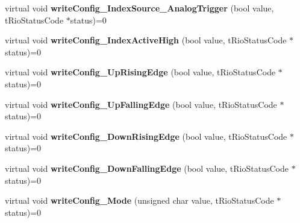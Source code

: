 \begin{DoxyCompactItemize}
\item 
\hypertarget{classnFPGA_1_1nFRC__2012__1__6__4_1_1tCounter_ad03db9ff9f48d67f1595a1c8d3b588aa}{
virtual void {\bfseries writeConfig\_\-IndexSource\_\-AnalogTrigger} (bool value, tRioStatusCode $\ast$status)=0}
\label{classnFPGA_1_1nFRC__2012__1__6__4_1_1tCounter_ad03db9ff9f48d67f1595a1c8d3b588aa}

\item 
\hypertarget{classnFPGA_1_1nFRC__2012__1__6__4_1_1tCounter_ae39e2f5f96f1052ef96d53181992181a}{
virtual void {\bfseries writeConfig\_\-IndexActiveHigh} (bool value, tRioStatusCode $\ast$status)=0}
\label{classnFPGA_1_1nFRC__2012__1__6__4_1_1tCounter_ae39e2f5f96f1052ef96d53181992181a}

\item 
\hypertarget{classnFPGA_1_1nFRC__2012__1__6__4_1_1tCounter_aeb59a5a98113fbf942f50ac3be8585b2}{
virtual void {\bfseries writeConfig\_\-UpRisingEdge} (bool value, tRioStatusCode $\ast$status)=0}
\label{classnFPGA_1_1nFRC__2012__1__6__4_1_1tCounter_aeb59a5a98113fbf942f50ac3be8585b2}

\item 
\hypertarget{classnFPGA_1_1nFRC__2012__1__6__4_1_1tCounter_acbb2b6f8e53f82a1be96b80454abe710}{
virtual void {\bfseries writeConfig\_\-UpFallingEdge} (bool value, tRioStatusCode $\ast$status)=0}
\label{classnFPGA_1_1nFRC__2012__1__6__4_1_1tCounter_acbb2b6f8e53f82a1be96b80454abe710}

\item 
\hypertarget{classnFPGA_1_1nFRC__2012__1__6__4_1_1tCounter_aa7fee146234fb6336c890e75c3d72048}{
virtual void {\bfseries writeConfig\_\-DownRisingEdge} (bool value, tRioStatusCode $\ast$status)=0}
\label{classnFPGA_1_1nFRC__2012__1__6__4_1_1tCounter_aa7fee146234fb6336c890e75c3d72048}

\item 
\hypertarget{classnFPGA_1_1nFRC__2012__1__6__4_1_1tCounter_a5d58c9ebce55b1a359ee305a42a89d24}{
virtual void {\bfseries writeConfig\_\-DownFallingEdge} (bool value, tRioStatusCode $\ast$status)=0}
\label{classnFPGA_1_1nFRC__2012__1__6__4_1_1tCounter_a5d58c9ebce55b1a359ee305a42a89d24}

\item 
\hypertarget{classnFPGA_1_1nFRC__2012__1__6__4_1_1tCounter_aed81240ffbf0d27d474054fdb3ad267d}{
virtual void {\bfseries writeConfig\_\-Mode} (unsigned char value, tRioStatusCode $\ast$status)=0}
\label{classnFPGA_1_1nFRC__2012__1__6__4_1_1tCounter_aed81240ffbf0d27d474054fdb3ad267d}


\end{DoxyCompactItemize}
